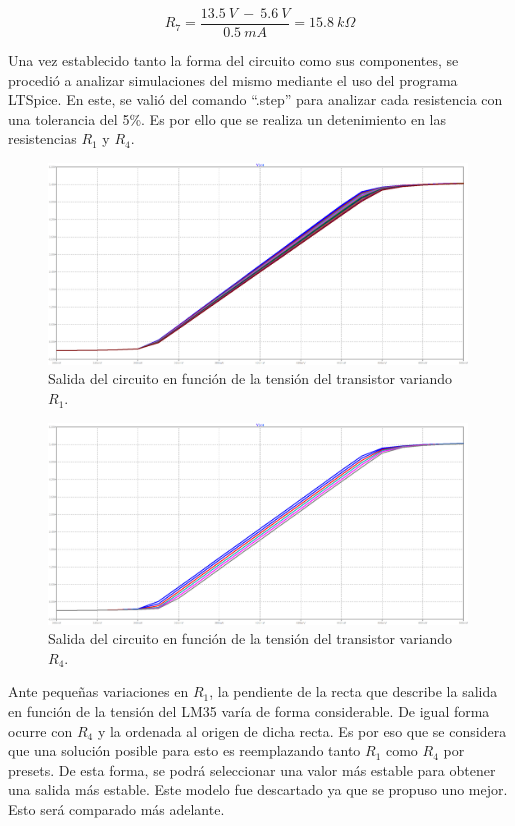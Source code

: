 \documentclass[a4paper]{article}
\begin{document}
\begin{equation}
	R_7 = \frac{13.5 \ V \ - \ 5.6 \ V}{0.5 \ mA} = 15.8 \ k\Omega
	\label{equ:condm1-5}
\end{equation}

Una vez establecido tanto la forma del circuito como sus componentes, se procedió a analizar simulaciones del mismo mediante el uso del programa LTSpice. En este, se valió del comando ``.step'' para analizar cada resistencia con una tolerancia del 5\%. Es por ello que se realiza un detenimiento en las resistencias $R_1$ y $R_4$.

\begin{figure}[H]
	\centering
	\includegraphics[width=0.99\textwidth]{Ejercicio6/Imagenes/StepR1-M1.png}
	\caption{Salida del circuito en función de la tensión del transistor variando $R_1$.}
	\label{fig:r1-M1}
\end{figure}

\begin{figure}[H]
	\centering
	\includegraphics[width=0.99\textwidth]{Ejercicio6/Imagenes/StepR4-M1.png}
	\caption{Salida del circuito en función de la tensión del transistor variando $R_4$.}
	\label{fig:r4-M1}
\end{figure}

Ante pequeñas variaciones en $R_1$, la pendiente de la recta que describe la salida en función de la tensión del LM35 varía de forma considerable. De igual forma ocurre con $R_4$ y la ordenada al origen de dicha recta. Es por eso que se considera que una solución posible para esto es reemplazando tanto $R_1$ como $R_4$ por presets. De esta forma, se podrá seleccionar una valor más estable para obtener una salida más estable.
Este modelo fue descartado ya que se propuso uno mejor. Esto será comparado más adelante.
\end{document}
